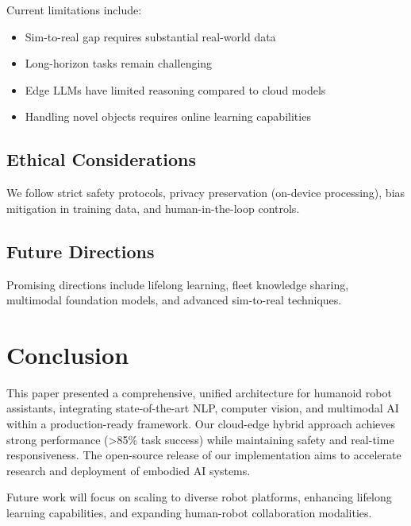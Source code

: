 \documentclass[conference]{IEEEtran}
\begin{document}
Current limitations include:
\begin{itemize}
    \item Sim-to-real gap requires substantial real-world data
    \item Long-horizon tasks remain challenging
    \item Edge LLMs have limited reasoning compared to cloud models
    \item Handling novel objects requires online learning capabilities
\end{itemize}

\subsection{Ethical Considerations}

We follow strict safety protocols, privacy preservation (on-device processing), bias mitigation in training data, and human-in-the-loop controls.

\subsection{Future Directions}

Promising directions include lifelong learning, fleet knowledge sharing, multimodal foundation models, and advanced sim-to-real techniques.

\section{Conclusion}
\label{sec:conclusion}

This paper presented a comprehensive, unified architecture for humanoid robot assistants, integrating state-of-the-art NLP, computer vision, and multimodal AI within a production-ready framework. Our cloud-edge hybrid approach achieves strong performance (>85\% task success) while maintaining safety and real-time responsiveness. The open-source release of our implementation aims to accelerate research and deployment of embodied AI systems.

Future work will focus on scaling to diverse robot platforms, enhancing lifelong learning capabilities, and expanding human-robot collaboration modalities.

\end{document}
